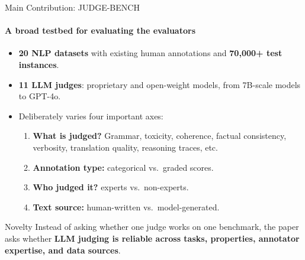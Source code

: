 \documentclass[10pt]{beamer}
\begin{document}
	\begin{frame}{Main Contribution: JUDGE-BENCH}
		\framesubtitle{A broad testbed for evaluating the evaluators}
		\begin{itemize}
			\item \textbf{20 NLP datasets} with existing human annotations and \textbf{70,000+ test instances}.
			\item \textbf{11 LLM judges}: proprietary and open-weight models, from 7B-scale models to GPT-4o.
			\item Deliberately varies four important axes:
			\begin{enumerate}
				\item \textbf{What is judged?} Grammar, toxicity, coherence, factual consistency, verbosity, translation quality, reasoning traces, etc.
				\item \textbf{Annotation type:} categorical vs.\ graded scores.
				\item \textbf{Who judged it?} experts vs.\ non-experts.
				\item \textbf{Text source:} human-written vs.\ model-generated.
			\end{enumerate}
		\end{itemize}
		
		\vspace{0.1cm}
		\begin{block}{Novelty}
			Instead of asking whether one judge works on one benchmark, the paper asks whether
			\textbf{LLM judging is reliable across tasks, properties, annotator expertise, and data sources}.
		\end{block}
	\end{frame}
	
\end{document}
